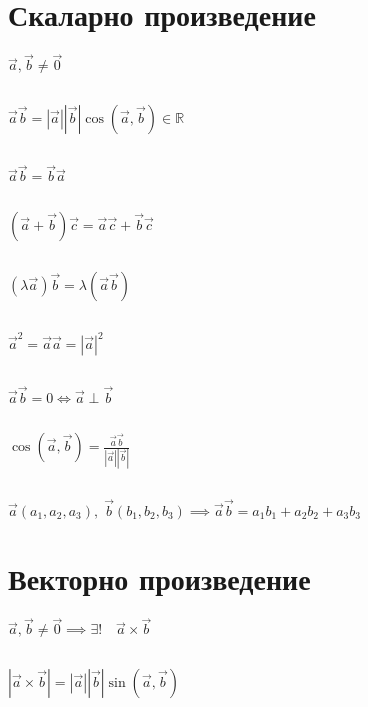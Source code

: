 \documentclass{article}
\newcommand{\vectr}{\overrightarrow}
\begin{document}
    \section{Скаларно произведение}
    \(\vectr{a}, \vectr{b} \neq \vectr{0}\)
    \subsection{}
    \(\vectr{a} \vectr{b} = |\vectr{a}| |\vectr{b}| \cos(\vectr{a}, \vectr{b}) \in \mathbb{R}\)
    \subsection{}
    \(\vectr{a} \vectr{b} = \vectr{b}\vectr{a}\)
    \subsection{}
    \((\vectr{a} + \vectr{b})\vectr{c} = \vectr{a}\vectr{c} + \vectr{b}\vectr{c}\)
    \subsection{}
    \((\lambda\vectr{a})\vectr{b} = \lambda(\vectr{a}\vectr{b})\)
    \subsection{}
    \(\vectr{a}^2 = \vectr{a} \vectr{a} = |\vectr{a}|^2\)
    \subsection{}
    \(\vectr{a} \vectr{b} = 0 \iff \vectr{a} \perp \vectr{b}\)
    \subsection{}
    \(\cos(\vectr{a}, \vectr{b}) = \frac{\vectr{a} \vectr{b}}{|\vectr{a}| |\vectr{b}|}\)
    \subsection{}
    \(\vectr{a}(a_1, a_2, a_3), \; \vectr{b}(b_1, b_2, b_3) \implies \vectr{a} \vectr{b} = a_1b_1 + a_2b_2 + a_3b_3\)
    \section{Векторно произведение}
    \(\vectr{a}, \vectr{b} \neq \vectr{0} \implies \exists! \quad \vectr{a} \times \vectr{b}\)
    \subsection{}
    \(|\vectr{a} \times \vectr{b}| = |\vectr{a}| |\vectr{b}| \sin(\vectr{a}, \vectr{b})\)
\end{document}
